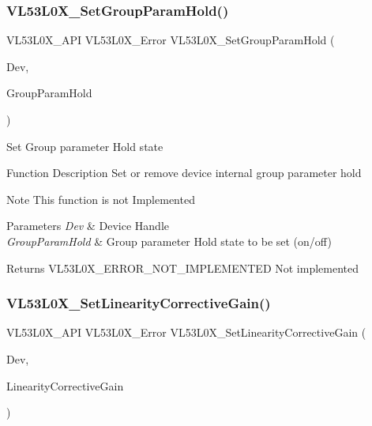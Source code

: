 \subsubsection{\texorpdfstring{V\+L53\+L0\+X\+\_\+\+Set\+Group\+Param\+Hold()}{VL53L0X\_SetGroupParamHold()}}
{\footnotesize\ttfamily V\+L53\+L0\+X\+\_\+\+A\+PI V\+L53\+L0\+X\+\_\+\+Error V\+L53\+L0\+X\+\_\+\+Set\+Group\+Param\+Hold (\begin{DoxyParamCaption}\item[{\hyperlink{group__VL53L0X__platform__group_ga2d6405308b1dd524b462f1b8fb97d167}{V\+L53\+L0\+X\+\_\+\+D\+EV}}]{Dev,  }\item[{\hyperlink{vl53l0x__types_8h_aba7bc1797add20fe3efdf37ced1182c5}{uint8\+\_\+t}}]{Group\+Param\+Hold }\end{DoxyParamCaption})}

Set Group parameter Hold state

\begin{DoxyParagraph}{Function Description}
Set or remove device internal group parameter hold
\end{DoxyParagraph}
\begin{DoxyNote}{Note}
This function is not Implemented
\end{DoxyNote}

\begin{DoxyParams}{Parameters}
{\em Dev} & Device Handle \\
\hline
{\em Group\+Param\+Hold} & Group parameter Hold state to be set (on/off) \\
\hline
\end{DoxyParams}
\begin{DoxyReturn}{Returns}
V\+L53\+L0\+X\+\_\+\+E\+R\+R\+O\+R\+\_\+\+N\+O\+T\+\_\+\+I\+M\+P\+L\+E\+M\+E\+N\+T\+ED Not implemented 
\end{DoxyReturn}
\mbox{\label{group__VL53L0X__general__group_ga9dca9bb612d109f31caae8f1eef38ac7}} 
\subsubsection{\texorpdfstring{V\+L53\+L0\+X\+\_\+\+Set\+Linearity\+Corrective\+Gain()}{VL53L0X\_SetLinearityCorrectiveGain()}}
{\footnotesize\ttfamily V\+L53\+L0\+X\+\_\+\+A\+PI V\+L53\+L0\+X\+\_\+\+Error V\+L53\+L0\+X\+\_\+\+Set\+Linearity\+Corrective\+Gain (\begin{DoxyParamCaption}\item[{\hyperlink{group__VL53L0X__platform__group_ga2d6405308b1dd524b462f1b8fb97d167}{V\+L53\+L0\+X\+\_\+\+D\+EV}}]{Dev,  }\item[{\hyperlink{vl53l0x__types_8h_aa343fa3b3d06292b959ffdd4c4703b06}{int16\+\_\+t}}]{Linearity\+Corrective\+Gain }\end{DoxyParamCaption})}

